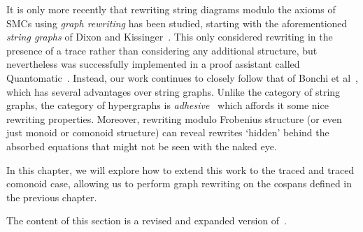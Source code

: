 It is only more recently that rewriting string diagrams modulo the axioms of
SMCs using \emph{graph rewriting} has been studied, starting with the
aforementioned \emph{string graphs} of Dixon and
Kissinger~\cite{dixon2010open,kissinger2012pictures,dixon2013opengraphs}.
This only considered rewriting in the presence of a trace rather than
considering any additional structure, but nevertheless was successfully
implemented in a proof assistant called
Quantomatic~\cite{kissinger2015quantomatic}.
Instead, our work continues to closely follow that of Bonchi et
al~\cite{bonchi2022string,bonchi2022stringa}, which has several advantages
over string graphs.
Unlike the category of string graphs, the category of hypergraphs is
\emph{adhesive}~\cite{lack2004adhesive} which affords it some nice rewriting
properties.
Moreover, rewriting modulo Frobenius structure (or even just monoid or comonoid
structure) can reveal rewrites `hidden' behind the absorbed equations that might
not be seen with the naked eye.

In this chapter, we will explore how to extend this work to the traced and
traced comonoid case, allowing us to perform graph rewriting on the cospans
defined in the previous chapter.

\begin{remark}
    The content of this section is a revised and expanded version
    of~\cite[Sec. 5]{ghica2023rewriting}.
\end{remark}



